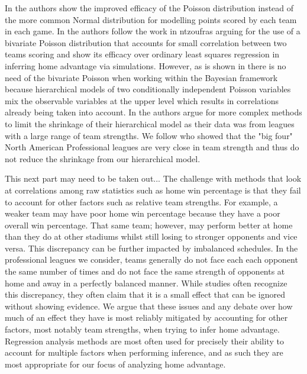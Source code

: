 In \cite{Lopez2018} the authors show the improved efficacy of the Poisson distribution instead of the more common Normal distribution \cite{GlickmanText2017} for modelling points scored by each team in each game. In \cite{Benz2020} the authors follow the work in ntzoufras arguing for the use of a bivariate Poisson distribution that accounts for small correlation between two teams scoring and show its efficacy over ordinary least squares regression in inferring home advantage via simulations. However, as is shown in \cite{Baio2010} there is no need of the bivariate Poisson when working within the Bayesian framework because hierarchical models of two conditionally independent Poisson variables mix the observable variables at the upper level which results in correlations already being taken into account. In \cite{Baio2010} the authors argue for more complex methods to limit the shrinkage of their hierarchical model as their data was from leagues with a large range of team strengths. We follow \cite{Lopez2018} who showed that the "big four" North American Professional leagues are very close in team strength and thus do not reduce the shrinkage from our hierarchical model.

This next part may need to be taken out...
The challenge with methods that look at correlations among raw statistics such as home win percentage is that they fail to account for other factors such as relative team strengths. For example, a weaker team may have poor home win percentage because they have a poor overall win percentage. That same team; however, may perform better at home than they do at other stadiums whilst still losing to stronger opponents and vice versa. This discrepancy can be further impacted by imbalanced schedules. In the professional leagues we consider, teams generally do not face each each opponent the same number of times and do not face the same strength of opponents at home and away in a perfectly balanced manner. While studies often recognize this discrepancy, they often claim that it is a small effect that can be ignored \cite{Pollard2005a} without showing evidence. We argue that these issues and any debate over how much of an effect they have is most reliably mitigated by accounting for other factors, most notably team strengths, when trying to infer home advantage. Regression analysis methods are most often used for precisely their ability to account for multiple factors when performing inference, and as such they are most appropriate for our focus of analyzing home advantage.

